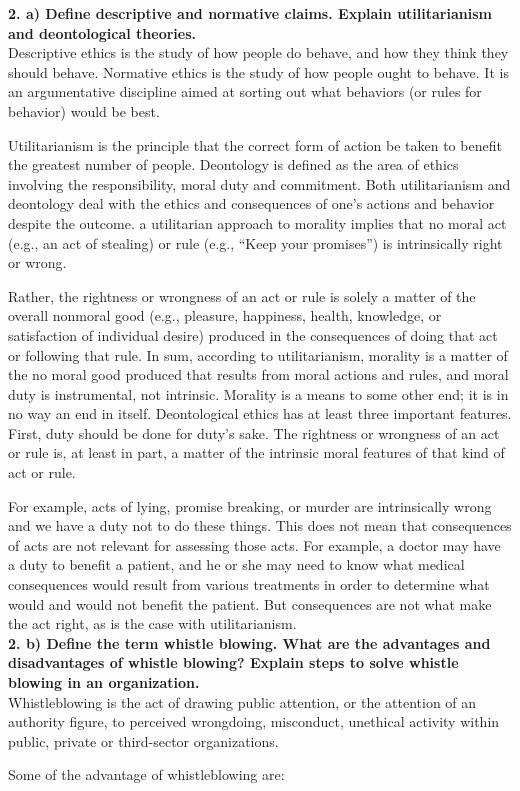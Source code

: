 \documentclass [12pt, a4paper]{article}
\begin{document}
\large
\textbf{2. a) Define descriptive and normative claims. Explain utilitarianism and deontological theories.}\\
\normalsize
Descriptive ethics is the study of how people do behave, and how they think they should behave. Normative ethics is the study of how people ought to behave. It is an argumentative discipline aimed at sorting out what behaviors (or rules for behavior) would be best.\\
\par
Utilitarianism is the principle that the correct form of action be taken to benefit the greatest number of people. Deontology is defined as the area of ethics involving the responsibility, moral duty and commitment. Both utilitarianism and deontology deal with the ethics and consequences of one’s actions and behavior despite the outcome. a utilitarian approach to morality implies that no moral act (e.g., an act of stealing) or rule (e.g., “Keep your promises”) is intrinsically right or wrong. \\
\par
Rather, the rightness or wrongness of an act or rule is solely a matter of the overall nonmoral good (e.g., pleasure, happiness, health, knowledge, or satisfaction of individual desire) produced in the consequences of doing that act or following that rule. In sum, according to utilitarianism, morality is a matter of the no moral good produced that results from moral actions and rules, and moral duty is instrumental, not intrinsic. Morality is a means to some other end; it is in no way an end in itself. Deontological ethics has at least three important features. First, duty should be done for duty’s sake. The rightness or wrongness of an act or rule is, at least in part, a matter of the intrinsic moral features of that kind of act or rule. \\
\par
For example, acts of lying, promise breaking, or murder are intrinsically wrong and we have a duty not to do these things. This does not mean that consequences of acts are not relevant for assessing those acts. For example, a doctor may have a duty to benefit a patient, and he or she may need to know what medical consequences would result from various treatments in order to determine what would and would not benefit the patient. But consequences are not what make the act right, as is the case with utilitarianism. \\

\large
\textbf{2. b) Define the term whistle blowing. What are the advantages and disadvantages of whistle blowing? Explain steps to solve whistle blowing in an organization.}\\
\normalsize
Whistleblowing is the act of drawing public attention, or the attention of an authority figure, to perceived wrongdoing, misconduct, unethical activity within public, private or third-sector organizations. \\
\par
Some of the advantage of whistleblowing are:
\end{document}
